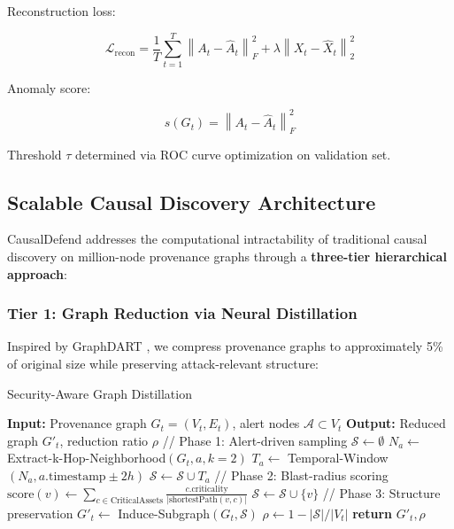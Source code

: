 \documentclass[conference]{IEEEtran}
\begin{document}
Reconstruction loss:

\begin{equation}
\mathcal{L}_{\text{recon}} = \frac{1}{T} \sum_{t=1}^T \left\| A_t - \hat{A}_t \right\|_F^2 + \lambda \left\| X_t - \hat{X}_t \right\|_2^2
\end{equation}

Anomaly score:

\begin{equation}
s(G_t) = \left\| A_t - \hat{A}_t \right\|_F^2
\end{equation}

Threshold $\tau$ determined via ROC curve optimization on validation set.

\subsection{Scalable Causal Discovery Architecture}

CausalDefend addresses the computational intractability of traditional causal discovery on million-node provenance graphs through a \textbf{three-tier hierarchical approach}:

\subsubsection{Tier 1: Graph Reduction via Neural Distillation}

Inspired by GraphDART \cite{graphdart2025}, we compress provenance graphs to approximately 5\% of original size while preserving attack-relevant structure:

\begin{algorithm}
\caption{Security-Aware Graph Distillation}
\begin{algorithmic}[1]
\STATE \textbf{Input:} Provenance graph $G_t = (V_t, E_t)$, alert nodes $\mathcal{A} \subset V_t$
\STATE \textbf{Output:} Reduced graph $G'_t$, reduction ratio $\rho$
\STATE
\STATE // Phase 1: Alert-driven sampling
\STATE $\mathcal{S} \leftarrow \emptyset$
    \STATE $N_a \leftarrow$ Extract-k-Hop-Neighborhood$(G_t, a, k=2)$
    \STATE $T_a \leftarrow$ Temporal-Window$(N_a, a.\text{timestamp} \pm 2h)$
    \STATE $\mathcal{S} \leftarrow \mathcal{S} \cup T_a$
\ENDFOR
\STATE
\STATE // Phase 2: Blast-radius scoring
    \STATE $\text{score}(v) \leftarrow \sum_{c \in \text{CriticalAssets}} \frac{c.\text{criticality}}{|\text{shortestPath}(v,c)|}$
        \STATE $\mathcal{S} \leftarrow \mathcal{S} \cup \{v\}$
    \ENDIF
\ENDFOR
\STATE
\STATE // Phase 3: Structure preservation
\STATE $G'_t \leftarrow$ Induce-Subgraph$(G_t, \mathcal{S})$
\STATE $\rho \leftarrow 1 - |\mathcal{S}|/|V_t|$
\STATE \textbf{return} $G'_t, \rho$
\end{algorithmic}
\end{algorithm}
\end{document}
